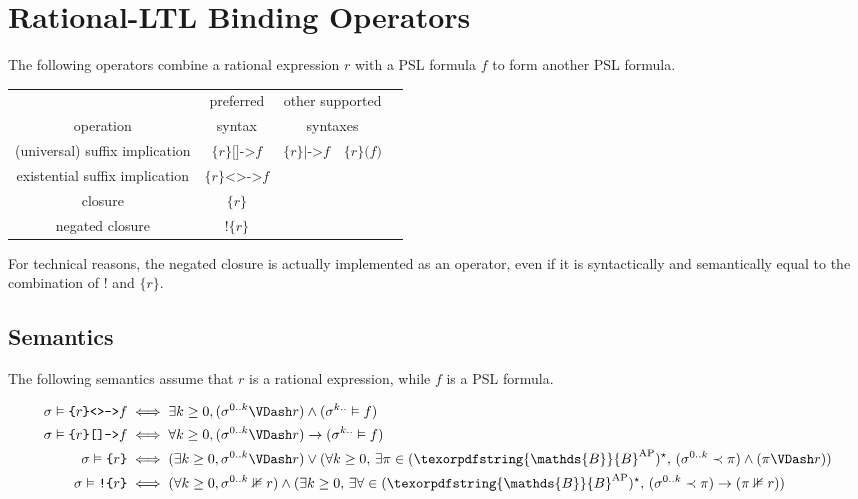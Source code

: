 \documentclass[a4paper,twoside,10pt,DIV=12,draft]{scrreprt}
\newcommand{\B}{\texorpdfstring{\ensuremath{\mathds{B}}}{B}}
\newcommand{\AP}{\ensuremath{\mathrm{AP}}}
\DeclareMathOperator{\NOT}{\texttt{!}}
\newcommand{\0}{\texttt{0}}
\newcommand{\1}{\texttt{1}}
\newcommand{\Esuffix}{\texttt{<>->}}
\newcommand{\Asuffix}{\texttt{[]->}}
\newcommand{\AsuffixALT}{\texttt{|->}}
\newcommand{\ratgroup}[1]{\texttt{\{}#1\texttt{\}}}
\newcommand{\nratgroup}[1]{\texttt{!\{}#1\texttt{\}}}
\def\limplies{\rightarrow}
\begin{document}
\section{Rational-LTL Binding Operators}

The following operators combine a rational expression $r$ with a PSL
formula $f$ to form another PSL formula.

\begin{center}
\begin{tabular}{ccccc}
              & preferred & \multicolumn{2}{c}{other supported} \\
   operation  & syntax    & \multicolumn{2}{c}{syntaxes}\\
  \hline
  (universal) suffix implication
  & $\ratgroup{r}\Asuffix{} f$
  & $\ratgroup{r}\AsuffixALT{} f$
  & $\ratgroup{r}\texttt{(}f\texttt{)}$
  \\
  existential suffix implication
  & $\ratgroup{r}\Esuffix{} f$
  \\
  closure
  & $\ratgroup{r}$
  \\
  negated closure
  & $\nratgroup{r}$
  \\
\end{tabular}
\end{center}

For technical reasons, the negated closure is actually implemented as
an operator, even if it is syntactically and semantically equal to the
combination of $\NOT$ and $\ratgroup{r}$.

\subsection{Semantics}

The following semantics assume that $r$ is a rational expression,
while $f$ is a PSL formula.

\begin{align*}
  \sigma\vDash \ratgroup{r}\Esuffix f &\iff \exists k\ge 0, (\sigma^{0..k}\VDash r)\land(\sigma^{k..}\vDash f)\\
  \sigma\vDash \ratgroup{r}\Asuffix f &\iff \forall k\ge 0, (\sigma^{0..k}\VDash r)\limplies (\sigma^{k..}\vDash f)\\
  \sigma\vDash \ratgroup{r} & \iff (\exists k\ge 0, \sigma^{0..k}\VDash r)\lor(\forall k\ge 0,\,\exists \pi\in(\B^\AP)^\star,\, (\sigma^{0..k}\prec \pi)\land(\pi\VDash r))\\
  \sigma\vDash \nratgroup{r} & \iff (\forall k\ge 0, \sigma^{0..k}\nVDash r)\land(\exists k\ge 0,\,\exists \forall\in(\B^\AP)^\star,\, (\sigma^{0..k}\prec \pi)\limplies(\pi\nVDash r))\\
\end{align*}
\end{document}
